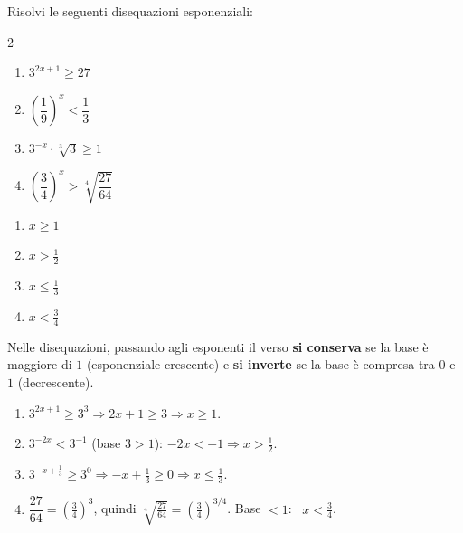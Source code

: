 \begin{question}[ID=5.2, subtitle={Disequazioni riconducibili alla stessa base}, difficulty=media, tags={disequazioni, esponenziali}]
Risolvi le seguenti disequazioni esponenziali:
\begin{center}\begin{minipage}{0.92\linewidth}
\begin{multicols}{2}
\begin{enumerate}[leftmargin=3.2cm]
\item $3^{2x+1} \geq 27$
\item $\left(\dfrac{1}{9}\right)^{x} < \dfrac{1}{3}$
\item $3^{-x} \cdot \sqrt[3]{3} \geq 1$
\item $\left(\dfrac{3}{4}\right)^{x} > \sqrt[4]{\dfrac{27}{64}}$
\end{enumerate}
\end{multicols}
\end{minipage}\end{center}
\begin{solution}
\begin{enumerate}
    \item $x\geq1$
    \item $x>\tfrac12$
    \item $x\leq\tfrac13$
    \item $x<\tfrac34$
\end{enumerate}
\end{solution}
\begin{explanation}
Nelle disequazioni, passando agli esponenti il verso \textbf{si conserva} se la base è maggiore di $1$ (esponenziale crescente) e \textbf{si inverte} se la base è compresa tra $0$ e $1$ (decrescente).
\begin{enumerate}
    \item $3^{2x+1}\geq3^3 \Rightarrow 2x+1\geq3 \Rightarrow x\geq1$.
    \item $3^{-2x}<3^{-1}$ (base $3>1$): $-2x<-1 \Rightarrow x>\tfrac12$.
    \item $3^{-x+\frac13}\geq3^0 \Rightarrow -x+\tfrac13\geq0 \Rightarrow x\leq\tfrac13$.
    \item $\dfrac{27}{64}=\left(\tfrac34\right)^3$, quindi $\sqrt[4]{\tfrac{27}{64}}=\left(\tfrac34\right)^{3/4}$. Base $<1$: \ $x<\tfrac34$.
\end{enumerate}
\end{explanation}
\end{question}


